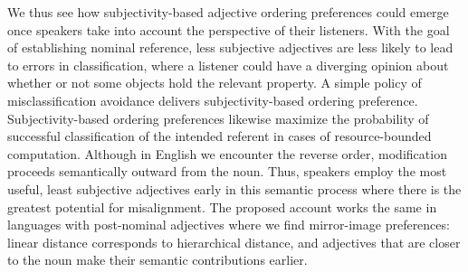 \documentclass{sp}
\begin{document}
We thus see how subjectivity-based adjective ordering preferences could emerge once speakers take into account the perspective of their listeners. With the goal of establishing nominal reference, less subjective adjectives are less likely to lead to errors in classification, where a listener could have a diverging opinion about whether or not some objects hold the relevant property. A simple policy of misclassification avoidance delivers subjectivity-based ordering preference. 
Subjectivity-based ordering preferences likewise maximize the probability of successful classification of the intended referent in cases of resource-bounded computation. 
Although in English we encounter the reverse order, modification proceeds semantically outward from the noun. Thus, speakers employ the most useful, least subjective adjectives early in this semantic process where there is the greatest potential for misalignment. %
The proposed account works the same in languages with post-nominal adjectives where we find mirror-image preferences: linear distance corresponds to hierarchical distance, and adjectives that are closer to the noun make their semantic contributions earlier.
\end{document}
